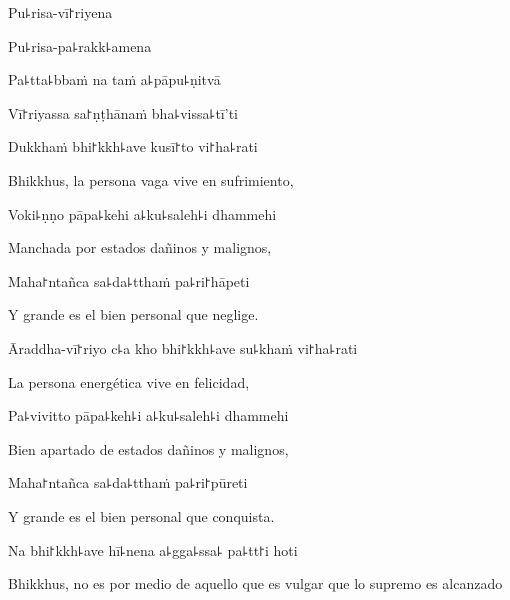 
Pu꜕risa-vī꜓riyena


Pu꜕risa-pa꜕rakk꜕amena


Pa꜕tta꜕bbaṁ na taṁ a꜕pāpu꜕ṇitvā


Vī꜓riyassa sa꜓ṇṭhānaṁ bha꜕vissa꜕tī'ti


Dukkhaṁ bhi꜓kkh꜕ave kusī꜓to vi꜓ha꜕rati

\begin{english}
	Bhikkhus, la persona vaga vive en sufrimiento,
\end{english}

Voki꜕ṇṇo pāpa꜕kehi a꜕ku꜕saleh꜕i dhammehi

\begin{english}
	Manchada por estados dañinos y malignos,
\end{english}

Maha꜓ntañca sa꜕da꜕tthaṁ pa꜕ri꜓hāpeti

\begin{english}
	Y grande es el bien personal que neglige.
\end{english}

\ifaivedition
\clearpage
\fi

Āraddha-vī꜓riyo c꜕a kho bhi꜓kkh꜕ave su꜕khaṁ vi꜓ha꜕rati

\begin{english}
	La persona energética vive en felicidad,
\end{english}

Pa꜕vivitto pāpa꜕keh꜕i a꜕ku꜕saleh꜕i dhammehi

\begin{english}
	Bien apartado de estados dañinos y malignos,
\end{english}

Maha꜓ntañca sa꜕da꜕tthaṁ pa꜕ri꜓pūreti

\begin{english}
	Y grande es el bien personal que conquista.
\end{english}

Na bhi꜓kkh꜕ave hī꜕nena a꜕gga꜕ssa꜕ pa꜕tt꜓i hoti

\begin{english}
	Bhikkhus, no es por medio de aquello que es vulgar que lo supremo es alcanzado
\end{english}

